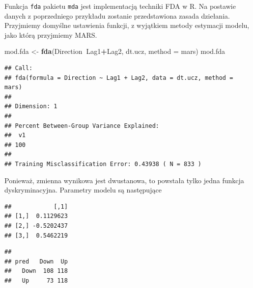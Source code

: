 \documentclass[]{book}
\newenvironment{Shaded}{\begin{snugshade}}{\end{snugshade}}
\newcommand{\DataTypeTok}[1]{\textcolor[rgb]{0.13,0.29,0.53}{#1}}
\newcommand{\KeywordTok}[1]{\textcolor[rgb]{0.13,0.29,0.53}{\textbf{#1}}}
\newcommand{\NormalTok}[1]{#1}
\newcommand{\OperatorTok}[1]{\textcolor[rgb]{0.81,0.36,0.00}{\textbf{#1}}}
\newcommand{\StringTok}[1]{\textcolor[rgb]{0.31,0.60,0.02}{#1}}
\theoremstyle{plain}
\theoremstyle{definition}
\theoremstyle{definition}
\theoremstyle{definition}
\theoremstyle{definition}
\theoremstyle{remark}
\let\BeginKnitrBlock\begin \let\EndKnitrBlock\end
\begin{document}
\BeginKnitrBlock{example}
\protect\hypertarget{exm:przykFDA}{}{\label{exm:przykFDA} }Funkcja \texttt{fda} pakietu \texttt{mda} jest implementacją techniki FDA w R. Na postawie danych z poprzedniego przykładu zostanie przedstawiona zasada dziełania. Przyjmiemy domyślne ustawienia funkcji, z wyjątkiem metody estymacji modelu, jako którą przyjmiemy MARS.
\EndKnitrBlock{example}

\begin{Shaded}
\begin{Highlighting}[]
\NormalTok{mod.fda <-}\StringTok{ }\KeywordTok{fda}\NormalTok{(Direction}\OperatorTok{~}\NormalTok{Lag1}\OperatorTok{+}\NormalTok{Lag2, dt.ucz, }\DataTypeTok{method =}\NormalTok{ mars)}
\NormalTok{mod.fda}
\end{Highlighting}
\end{Shaded}

\begin{verbatim}
## Call:
## fda(formula = Direction ~ Lag1 + Lag2, data = dt.ucz, method = mars)
## 
## Dimension: 1 
## 
## Percent Between-Group Variance Explained:
##  v1 
## 100 
## 
## Training Misclassification Error: 0.43938 ( N = 833 )
\end{verbatim}

Ponieważ, zmienna wynikowa jest dwustanowa, to powstała tylko jedna funkcja dyskryminacyjna.
Parametry modelu są następujące

\begin{Shaded}
\end{Shaded}

\begin{verbatim}
##            [,1]
## [1,]  0.1129623
## [2,] -0.5202437
## [3,]  0.5462219
\end{verbatim}

\begin{Shaded}
\end{Shaded}

\begin{verbatim}
##       
## pred   Down  Up
##   Down  108 118
##   Up     73 118
\end{verbatim}
\end{document}
